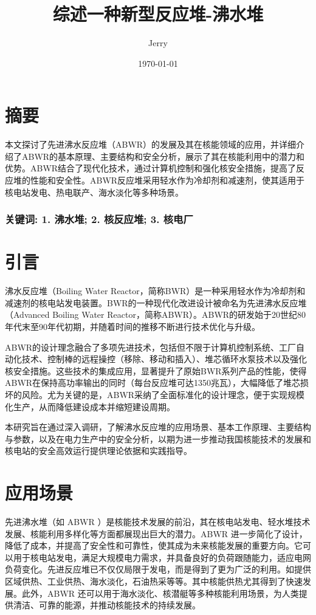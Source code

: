 \documentclass{article}
\title{\bf\huge 综述一种新型反应堆-沸水堆}
\author{Jerry}
\date{\today}
\begin{document}
\fancyfoot[C]{\thepage}

\maketitle

\section*{摘要}
本文探讨了先进沸水反应堆（ABWR）的发展及其在核能领域的应用，并详细介绍了ABWR的基本原理、主要结构和安全分析，展示了其在核能利用中的潜力和优势。ABWR结合了现代化技术，通过计算机控制和强化核安全措施，提高了反应堆的性能和安全性。ABWR反应堆采用轻水作为冷却剂和减速剂，使其适用于核电站发电、热电联产、海水淡化等多种场景。
\subsubsection*{关键词: 1. 沸水堆; 2. 核反应堆; 3. 核电厂}

\section{引言}

沸水反应堆（Boiling Water Reactor，简称BWR）是一种采用轻水作为冷却剂和减速剂的核电站发电装置。BWR的一种现代化改进设计被命名为先进沸水反应堆（Advanced Boiling Water Reactor，简称ABWR）。ABWR的研发始于20世纪80年代末至90年代初期，并随着时间的推移不断进行技术优化与升级。

ABWR的设计理念融合了多项先进技术，包括但不限于计算机控制系统、工厂自动化技术、控制棒的远程操控（移除、移动和插入）、堆芯循环水泵技术以及强化核安全措施。这些技术的集成应用，显著提升了原始BWR系列产品的性能，使得ABWR在保持高功率输出的同时（每台反应堆可达1350兆瓦），大幅降低了堆芯损坏的风险。尤为关键的是，ABWR采纳了全面标准化的设计理念，便于实现规模化生产，从而降低建设成本并缩短建设周期。

本研究旨在通过深入调研，了解沸水反应堆的应用场景、基本工作原理、主要结构与参数，以及在电力生产中的安全分析，以期为进一步推动我国核能技术的发展和核电站的安全高效运行提供理论依据和实践指导。

\section{应用场景}

先进沸水堆（如 ABWR ）是核能技术发展的前沿，其在核电站发电、轻水堆技术发展、核能利用多样化等方面都展现出巨大的潜力。ABWR 进一步简化了设计，降低了成本，并提高了安全性和可靠性，使其成为未来核能发展的重要方向。它可以用于核电站发电，满足大规模电力需求，并具备良好的负荷跟随能力，适应电网负荷变化。先进反应堆已不仅仅局限于发电，而是得到了更为广泛的利用。如提供区域供热、工业供热、海水淡化，石油热采等等。其中核能供热尤其得到了快速发展。此外，ABWR 还可以用于海水淡化、核潜艇等多种核能利用场景，为人类提供清洁、可靠的能源，并推动核能技术的持续发展。\cite{kreithMECHANICALAEROSPACEENGINEERING}\cite{ChenJing600MWXiaoXingXianJinFeiShuiDuiGaiNianSheJiPdf1999}\cite{stosicBoilingWaterReactor2008}
\end{document}
